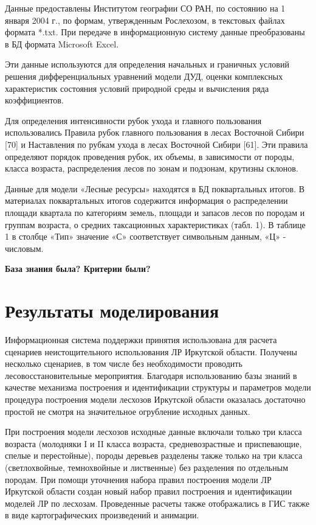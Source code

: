 Данные предоставлены Институтом географии
СО РАН, по состоянию на 1 января 2004 г., по формам,
утвержденным Рослехозом, в текстовых файлах
формата *.txt. При передаче в информационную систему
данные преобразованы в БД формата Microsoft Excel.

Эти данные используются для определения начальных
и граничных условий решения дифференциальных
уравнений модели ДУД, оценки комплексных характеристик
состояния условий природной среды и вычисления
ряда коэффициентов.

Для определения интенсивности рубок ухода
и главного пользования использовались Правила
рубок главного пользования в лесах Восточной
Сибири [70] и Наставления по рубкам ухода в лесах
Восточной Сибири [61]. Эти правила определяют
порядок проведения рубок, их объемы, в зависимости
от породы, класса возраста, распределения лесов
по зонам и подзонам, крутизны склонов.

Данные для модели «Лесные ресурсы» находятся в БД поквартальных итогов. В материалах поквартальных итогов содержится информация о распределении площади квартала по категориям земель, площади и запасов лесов по породам и группам возраста, о средних таксационных характеристиках (табл. 1). В таблице 1 в столбце «Тип» значение «С» соответствует символьным данным, «Ц» - числовым.

{ \bf База знания была? Критерии были?}

\section{Результаты моделирования}

Информационная система поддержки принятия использована для расчета сценариев неистощительного использования ЛР Иркутской области. Получены несколько сценариев, в том числе без необходимости проводить лесовосстановительные мероприятия. Благодаря использованию базы знаний в качестве механизма построения и идентификации структуры и параметров модели процедура построения модели лесхозов Иркутской области оказалась достаточно простой не смотря на значительное огрубление исходных данных.

При построения модели лесхозов исходные данные включали только три класса возраста (молодняки I и II класса возраста, средневозрастные и приспевающие, спелые и перестойные), породы деревьев разделены также только на три класса (светлохвойные, темнохвойные и лиственные) без разделения по отдельным породам. При помощи уточнения набора правил построения модели ЛР Иркутской области создан новый набор правил построения и идентификации моделей ЛР по лесхозам. Проведенные расчеты также отображались в ГИС также в виде картографических произведений и анимации.

